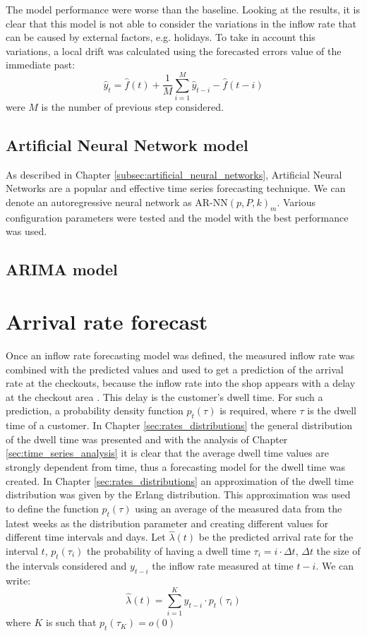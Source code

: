 The model performance were worse than the baseline. Looking at the results, it is clear that this model is not able to consider the variations in the inflow rate that can be caused by external factors, e.g. holidays. To take in account this variations, a local drift was calculated using the forecasted errors value of the immediate past:
\[ \hat{y}_t = \hat{f}(t) + \frac{1}{M} \sum_{i=1}^{M} \hat{y}_{t-i} - \hat{f}(t-i) \]
were \(M\) is the number of previous step considered.

\subsection{Artificial Neural Network model}
\label{subsec:ann_model}
As described in Chapter \ref{subsec:artificial_neural_networks}, Artificial Neural Networks are a popular and effective time series forecasting technique. We can denote an autoregressive neural network as \( \text{AR-NN}(p, P, k)_m \). Various configuration parameters were tested and the model with the best performance was used.

\subsection{ARIMA model}
\label{subsec:arima_model}

\section{Arrival rate forecast}
\label{sec:arrival_rate_forecast}
Once an inflow rate forecasting model was defined, the measured inflow rate was combined with the predicted values and used to get a prediction of the arrival rate at the checkouts, because the inflow rate into the shop appears with a delay at the checkout area \cite{aksu}. This delay is the customer's dwell time. For such a prediction, a probability density function \( p_t(\tau) \) is required, where \( \tau \) is the dwell time of a customer.
In Chapter \ref{sec:rates_distributions} the general distribution of the dwell time was presented and with the analysis of Chapter \ref{sec:time_series_analysis} it is clear that the average dwell time values are strongly dependent from time, thus a forecasting model for the dwell time was created.
In Chapter \ref{sec:rates_distributions} an approximation of the dwell time distribution was given by the Erlang distribution. This approximation was used to define the function \( p_t(\tau) \) using an average of the measured data from the latest weeks as the distribution parameter and creating different values for different time intervals and days.
Let \( \hat{\lambda}(t) \) be the predicted arrival rate for the interval \( t \), \( p_t(\tau_i) \) the probability of having a dwell time \( \tau_i = i \cdot \Delta t \), \( \Delta t \) the size of the intervals considered and \( y_{t-i} \) the inflow rate measured at time \( t-i \). We can write:
\[ \hat{\lambda}(t) = \sum_{i=1}^{K} y_{t-i} \cdot p_t(\tau_i) \]
where \( K \) is such that \( p_t(\tau_K) = o(0) \) %

